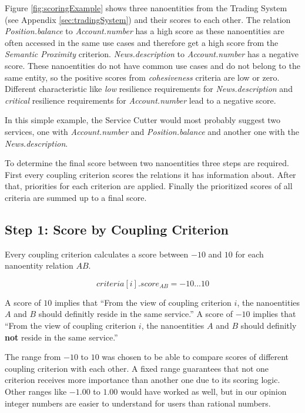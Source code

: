 Figure \ref{fig:scoringExample} shows three nanoentities from the Trading System (see Appendix \ref{sec:tradingSystem}) and their scores to each other. The relation \textit{Position.balance} to \textit{Account.number} has a high score as these nanoentities are often accessed in the same use cases and therefore get a high score from the \textit{Semantic Proximity} criterion. \textit{News.description} to \textit{Account.number} has a negative score. These nanoentities do not have common use cases and do not belong to the same entity, so the positive scores from \textit{cohesiveness} criteria are low or zero. Different characteristic like \textit{low} resilience requirements for \textit{News.description} and \textit{critical} resilience requirements for \textit{Account.number} lead to a negative score. 

In this simple example, the Service Cutter would most probably suggest two services, one with \textit{Account.number} and \textit{Position.balance} and another one with the \textit{News.description}.

To determine the final score between two nanoentities three steps are required. First every coupling criterion scores the relations it has information about. After that, priorities for each criterion are applied. Finally the prioritized scores of all criteria are summed up to a final score.

\subsection{Step 1: Score by Coupling Criterion}

Every coupling criterion calculates a score between $-10$ and $10$ for each nanoentity relation $AB$. 

\begin{displaymath}
criteria[i].score_{AB} = -10 ... 10
\end{displaymath}

A score of $10$ implies that \enquote{From the view of coupling criterion $i$, the nanoentities $A$ and $B$ should definitly reside in the same service.} A score of $-10$ implies that \enquote{From the view of coupling criterion $i$, the nanoentities $A$ and $B$ should definitly \textbf{not} reside in the same service.} 

The range from $-10$ to  $10$ was chosen to be able to compare scores of different coupling criterion with each other. A fixed range guarantees that not one criterion receives more importance than another one due to its scoring logic. Other ranges like $-1.00$ to $1.00$ would have worked as well, but in our opinion integer numbers are easier to understand for users than rational numbers. 

